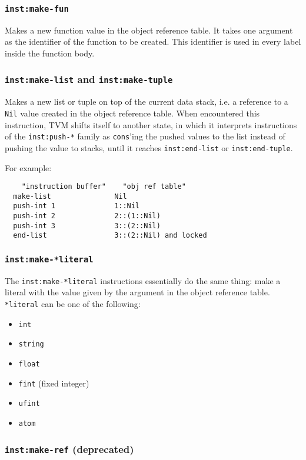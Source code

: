 \documentclass{article}
\newcommand{\inst}[1] {\texttt{inst:#1}}
\begin{document}
\subsubsection{\inst{make-fun}}

Makes a new function value in the object reference table. It takes one argument as the identifier of the function to be created. This identifier is used in every label inside the function body.

\subsubsection{\inst{make-list} and \inst{make-tuple}}

Makes a new list or tuple on top of the current data stack, i.e. a reference to a \texttt{Nil} value created in the object reference table. When encountered this instruction, TVM shifts itself to another state, in which it interprets instructions of the \inst{push-*} family as \texttt{cons}'ing the pushed values to the list instead of pushing the value to stacks, until it reaches \inst{end-list} or \inst{end-tuple}.

For example:
\begin{verbatim}
    "instruction buffer"    "obj ref table"
  make-list               Nil
  push-int 1              1::Nil
  push-int 2              2::(1::Nil)
  push-int 3              3::(2::Nil)
  end-list                3::(2::Nil) and locked
\end{verbatim}

\subsubsection{\inst{make-*literal}}

The \inst{make-*literal} instructions essentially do the same thing: make a literal with the value given by the argument in the object reference table. \texttt{*literal} can be one of the following:
\begin{itemize}
\item \texttt{int}
\item \texttt{string}
\item \texttt{float}
\item \texttt{fint} (fixed integer)
\item \texttt{ufint}
\item \texttt{atom}
\end{itemize}

\subsubsection{\inst{make-ref} (deprecated)}
\end{document}
